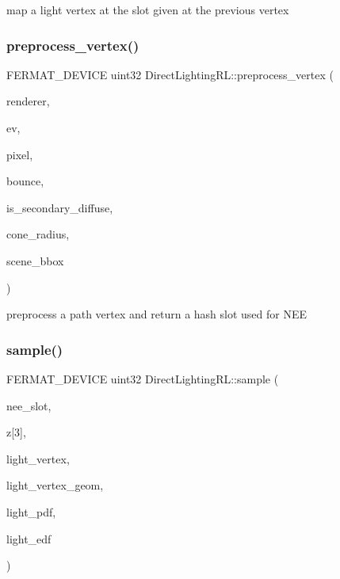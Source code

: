 map a light vertex at the slot given at the previous vertex \mbox{\label{struct_direct_lighting_r_l_ab699ac7e5d3bfc88cef0849438334065}} 
\subsubsection{\texorpdfstring{preprocess\+\_\+vertex()}{preprocess\_vertex()}}
{\footnotesize\ttfamily F\+E\+R\+M\+A\+T\+\_\+\+D\+E\+V\+I\+CE uint32 Direct\+Lighting\+R\+L\+::preprocess\+\_\+vertex (\begin{DoxyParamCaption}\item[{const \hyperlink{struct_rendering_context_view}{Rendering\+Context\+View} \&}]{renderer,  }\item[{const \hyperlink{struct_eye_vertex}{Eye\+Vertex} \&}]{ev,  }\item[{const uint32}]{pixel,  }\item[{const uint32}]{bounce,  }\item[{const bool}]{is\+\_\+secondary\+\_\+diffuse,  }\item[{const float}]{cone\+\_\+radius,  }\item[{const \hyperlink{structcugar_1_1_bbox}{cugar\+::\+Bbox3f}}]{scene\+\_\+bbox }\end{DoxyParamCaption})\hspace{0.3cm}{\ttfamily [inline]}}

preprocess a path vertex and return a hash slot used for N\+EE \mbox{\label{struct_direct_lighting_r_l_aa1f5e8005e659be71588e0ae72f5f79b}} 
\subsubsection{\texorpdfstring{sample()}{sample()}}
{\footnotesize\ttfamily F\+E\+R\+M\+A\+T\+\_\+\+D\+E\+V\+I\+CE uint32 Direct\+Lighting\+R\+L\+::sample (\begin{DoxyParamCaption}\item[{const uint32}]{nee\+\_\+slot,  }\item[{const float}]{z\mbox{[}3\mbox{]},  }\item[{\hyperlink{struct_vertex_geometry_id}{Vertex\+Geometry\+Id} $\ast$}]{light\+\_\+vertex,  }\item[{\hyperlink{struct_vertex_geometry}{Vertex\+Geometry} $\ast$}]{light\+\_\+vertex\+\_\+geom,  }\item[{float $\ast$}]{light\+\_\+pdf,  }\item[{\hyperlink{struct_edf}{Edf} $\ast$}]{light\+\_\+edf }\end{DoxyParamCaption})\hspace{0.3cm}{\ttfamily [inline]}}

